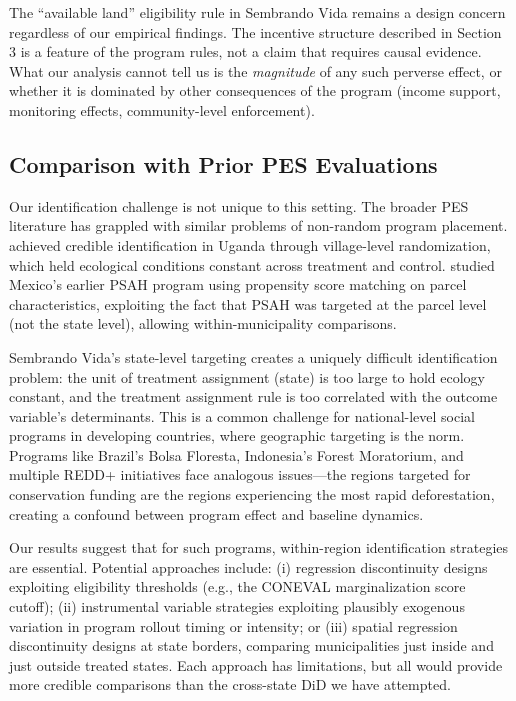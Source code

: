 \documentclass[12pt]{article}
\begin{document}
The ``available land'' eligibility rule in Sembrando Vida remains a design concern regardless of our empirical findings. The incentive structure described in Section 3 is a feature of the program rules, not a claim that requires causal evidence. What our analysis cannot tell us is the \textit{magnitude} of any such perverse effect, or whether it is dominated by other consequences of the program (income support, monitoring effects, community-level enforcement).

\subsection{Comparison with Prior PES Evaluations}

Our identification challenge is not unique to this setting. The broader PES literature has grappled with similar problems of non-random program placement. \citet{jayachandran2017cash} achieved credible identification in Uganda through village-level randomization, which held ecological conditions constant across treatment and control. \citet{alix2012deforestation} studied Mexico's earlier PSAH program using propensity score matching on parcel characteristics, exploiting the fact that PSAH was targeted at the parcel level (not the state level), allowing within-municipality comparisons.

Sembrando Vida's state-level targeting creates a uniquely difficult identification problem: the unit of treatment assignment (state) is too large to hold ecology constant, and the treatment assignment rule is too correlated with the outcome variable's determinants. This is a common challenge for national-level social programs in developing countries, where geographic targeting is the norm. Programs like Brazil's Bolsa Floresta, Indonesia's Forest Moratorium, and multiple REDD+ initiatives face analogous issues---the regions targeted for conservation funding are the regions experiencing the most rapid deforestation, creating a confound between program effect and baseline dynamics.

Our results suggest that for such programs, within-region identification strategies are essential. Potential approaches include: (i) regression discontinuity designs exploiting eligibility thresholds (e.g., the CONEVAL marginalization score cutoff); (ii) instrumental variable strategies exploiting plausibly exogenous variation in program rollout timing or intensity; or (iii) spatial regression discontinuity designs at state borders, comparing municipalities just inside and just outside treated states. Each approach has limitations, but all would provide more credible comparisons than the cross-state DiD we have attempted.
\end{document}
